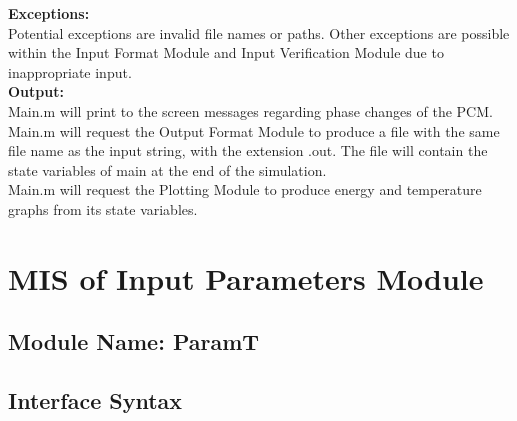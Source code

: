 \documentclass[12pt]{article}
\begin{document}
\noindent \textbf{Exceptions:}\\
Potential exceptions are invalid file names or paths. Other exceptions are possible within the Input Format Module and Input Verification Module due to inappropriate input.\\

\noindent \textbf{Output:}\\
Main.m will print to the screen messages regarding phase changes of the PCM.\\
Main.m will request the Output Format Module to produce a file with the  same file
name as the input string, with the extension .out. The file will contain the 
state variables of main at the end of the simulation.\\
Main.m will request the Plotting Module to produce energy and temperature graphs
from its state variables.


\section{MIS of Input Parameters Module}

\subsection{Module Name: ParamT} %





\subsection{Interface Syntax}
\end{document}
